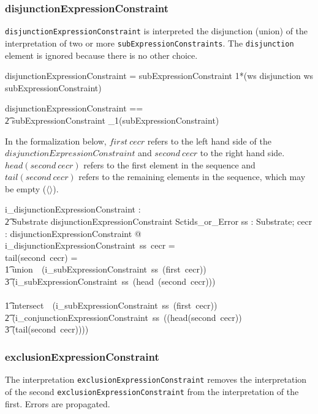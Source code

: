 \documentclass{article}
\def\spec#1{{\tt #1}}
\def\bnf#1{{\scriptsize {{#1}} }}
\begin{document}
\subsubsection{disjunctionExpressionConstraint}
\spec{disjunctionExpressionConstraint} is interpreted the disjunction (union) of the interpretation of two or more
\spec{subExpressionConstraints}. The \spec{disjunction} element is ignored because there is no other choice.
\begin{framed}
\noindent
\bnf{disjunctionExpressionConstraint = subExpressionConstraint 1*(ws disjunction ws subExpressionConstraint)}
\end{framed}

\begin{zed}
disjunctionExpressionConstraint == \\
\t2 subExpressionConstraint \cross \seq_1(subExpressionConstraint)
\end{zed}

In the formalization below, $first ~cecr$ refers to the left hand side of the $disjunctionExpressionConstraint$ and
$second ~cecr$ to the right hand side.  $head (second~cecr)$ refers to the first element in the sequence and 
$tail (second~cecr)$ refers to the remaining elements in the sequence, which may be empty ($\langle \rangle$).

\begin{gendef}
    i\_disjunctionExpressionConstraint : \\
\t2 Substrate \fun disjunctionExpressionConstraint \fun Sctids\_or\_Error
\where
   \forall ss : Substrate;  cecr : disjunctionExpressionConstraint @ \\
i\_disjunctionExpressionConstraint~ss~cecr = \\
   \IF tail(second~cecr) = \langle \rangle \THEN \\
\t1 union~~(i\_subExpressionConstraint~ss~(first~cecr)) \\
\t3 (i\_subExpressionConstraint~ss~(head~(second~cecr))) \\
   \ELSE \\
\t1 intersect~~(i\_subExpressionConstraint~ss~(first~cecr)) \\
\t2 (i\_conjunctionExpressionConstraint~ss~((head(second~cecr)) \\
\t3 (tail(second~cecr))))
\end{gendef}



\subsubsection{exclusionExpressionConstraint}
The interpretation \spec{exclusionExpressionConstraint} removes the interpretation of the second \spec{exclusionExpressionConstraint} from
the interpretation of the first.  Errors are propagated.
\end{document}
